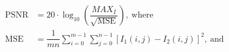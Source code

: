\begin{align} 
    \text{PSNR} &= 20 \cdot \log_{10}\left(\dfrac{MAX_I}{\sqrt{\text{MSE}}}\right) \label{eq:psnr}, \ \text{where} \\ 
    \text{MSE} &= \dfrac{1}{m n} \sum_{i = 0}^{m-1} \sum_{j = 0}^{n-1} \left[I_1(i,j) - I_2(i, j) \right]^2, \ \text{and} \label{eq:mse}
\end{align}